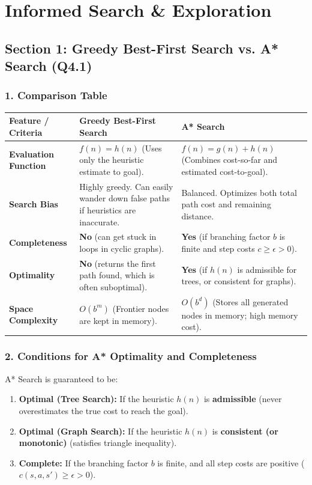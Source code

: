 \chapter{Informed Search \& Exploration}



\section{Section 1: Greedy Best-First Search vs. A* Search (Q4.1)}

\subsection{1. Comparison Table}

\begin{table}[H]
\centering
\begin{tabular}{|p{}|p{}|p{}|}
\hline
Feature / Criteria & Greedy Best-First Search & A* Search \\
\hline
\textbf{Evaluation Function} & $f(n) = h(n)$ (Uses only the heuristic estimate to goal). & $f(n) = g(n) + h(n)$ (Combines cost-so-far and estimated cost-to-goal). \\
\hline
\textbf{Search Bias} & Highly greedy. Can easily wander down false paths if heuristics are inaccurate. & Balanced. Optimizes both total path cost and remaining distance. \\
\hline
\textbf{Completeness} & \textbf{No} (can get stuck in loops in cyclic graphs). & \textbf{Yes} (if branching factor $b$ is finite and step costs $c \ge \epsilon > 0$). \\
\hline
\textbf{Optimality} & \textbf{No} (returns the first path found, which is often suboptimal). & \textbf{Yes} (if $h(n)$ is admissible for trees, or consistent for graphs). \\
\hline
\textbf{Space Complexity} & $O(b^m)$ (Frontier nodes are kept in memory). & $O(b^d)$ (Stores all generated nodes in memory; high memory cost). \\
\hline
\end{tabular}
\end{table}

\subsection{2. Conditions for A* Optimality and Completeness}
A* Search is guaranteed to be:
\begin{enumerate}
  \item \textbf{Optimal (Tree Search):} If the heuristic $h(n)$ is \textbf{admissible} (never overestimates the true cost to reach the goal).
  \item \textbf{Optimal (Graph Search):} If the heuristic $h(n)$ is \textbf{consistent (or monotonic)} (satisfies triangle inequality).
  \item \textbf{Complete:} If the branching factor $b$ is finite, and all step costs are positive ($c(s, a, s') \ge \epsilon > 0$).
\end{enumerate}


